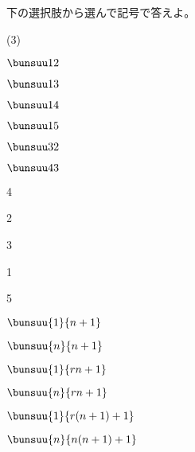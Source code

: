 下の選択肢から選んで記号で答えよ。
\begin{jquote}(3\zw)
\begin{betaenumerate}[A. ]
\item $\bunsuu12$
\item $\bunsuu13$
\item $\bunsuu14$
\item $\bunsuu15$
\item $\bunsuu32$
\item $\bunsuu43$
\item 4
\item 2
\item 3
\item 1
\item 5
\item $\bunsuu{1}{n+1}$
\item $\bunsuu{n}{n+1}$
\item $\bunsuu{1}{rn+1}$
\item $\bunsuu{n}{rn+1}$
\item $\bunsuu{1}{r(n+1)+1}$
\item $\bunsuu{n}{n(n+1)+1}$
\end{betaenumerate}
\end{jquote}

